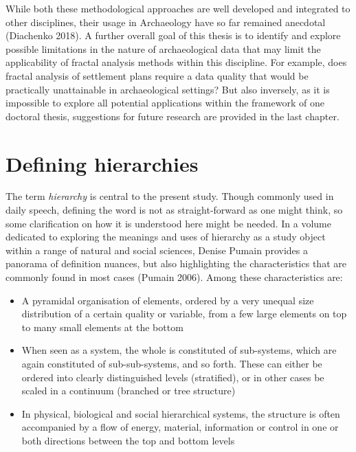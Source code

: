 \documentclass[
  12pt,
]{book}
\begin{document}
While both these methodological approaches are well developed and integrated to other disciplines, their usage in Archaeology have so far remained anecdotal (Diachenko 2018). A further overall goal of this thesis is to identify and explore possible limitations in the nature of archaeological data that may limit the applicability of fractal analysis methods within this discipline. For example, does fractal analysis of settlement plans require a data quality that would be practically unattainable in archaeological settings? But also inversely, as it is impossible to explore all potential applications within the framework of one doctoral thesis, suggestions for future research are provided in the last chapter.

\hypertarget{defining-hierarchies}{%
\section{Defining hierarchies}\label{defining-hierarchies}}

The term \emph{hierarchy} is central to the present study. Though commonly used in daily speech, defining the word is not as straight-forward as one might think, so some clarification on how it is understood here might be needed. In a volume dedicated to exploring the meanings and uses of hierarchy as a study object within a range of natural and social sciences, Denise Pumain provides a panorama of definition nuances, but also highlighting the characteristics that are commonly found in most cases (Pumain 2006). Among these characteristics are:

\begin{itemize}
\item
  A pyramidal organisation of elements, ordered by a very unequal size distribution of a certain quality or variable, from a few large elements on top to many small elements at the bottom
\item
  When seen as a system, the whole is constituted of sub-systems, which are again constituted of sub-sub-systems, and so forth. These can either be ordered into clearly distinguished levels (stratified), or in other cases be scaled in a continuum (branched or tree structure)
\item
  In physical, biological and social hierarchical systems, the structure is often accompanied by a flow of energy, material, information or control in one or both directions between the top and bottom levels
\end{itemize}
\end{document}
